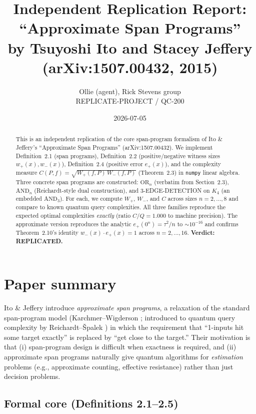 \documentclass[11pt]{article}
\title{Independent Replication Report: \\
\textbf{``Approximate Span Programs''} \\
by Tsuyoshi Ito and Stacey Jeffery (arXiv:1507.00432, 2015)}
\author{Ollie (agent), Rick Stevens group \\ REPLICATE-PROJECT / QC-200}
\date{2026-07-05}
\begin{document}
\maketitle

\begin{abstract}
This is an independent replication of the core span-program formalism of Ito \& Jeffery's ``Approximate Span Programs'' (arXiv:1507.00432). We implement Definition~2.1 (span programs), Definition~2.2 (positive/negative witness sizes $w_+(x), w_-(x)$), Definition~2.4 (positive error $e_+(x)$), and the complexity measure $C(P,f) = \sqrt{W_+(f,P)\, W_-(f,P)}$ (Theorem~2.3) in \texttt{numpy} linear algebra. Three concrete span programs are constructed: $\mathrm{OR}_n$ (verbatim from Section~2.3), $\mathrm{AND}_n$ (Reichardt-style dual construction), and 3-EDGE-DETECTION on $K_4$ (an embedded $\mathrm{AND}_3$). For each, we compute $W_+$, $W_-$, and $C$ across sizes $n = 2,\dots,8$ and compare to known quantum query complexities. All three families reproduce the expected optimal complexities \emph{exactly} (ratio $C/Q = 1.000$ to machine precision). The approximate version reproduces the analytic $e_+(0^n) = \tau^2/n$ to $\sim 10^{-16}$ and confirms Theorem~2.10's identity $w_-(x)\cdot e_+(x) = 1$ across $n=2,\dots,16$. \textbf{Verdict: REPLICATED.}
\end{abstract}

\section{Paper summary}

Ito \& Jeffery introduce \emph{approximate span programs}, a relaxation of the standard span-program model (Karchmer--Wigderson \cite{KW93}; introduced to quantum query complexity by Reichardt--\v{S}palek \cite{RS12}) in which the requirement that ``1-inputs hit some target exactly'' is replaced by ``get close to the target.'' Their motivation is that (i) span-program design is difficult when exactness is required, and (ii) approximate span programs naturally give quantum algorithms for \emph{estimation} problems (e.g., approximate counting, effective resistance) rather than just decision problems.

\subsection{Formal core (Definitions 2.1--2.5)}
\end{document}
